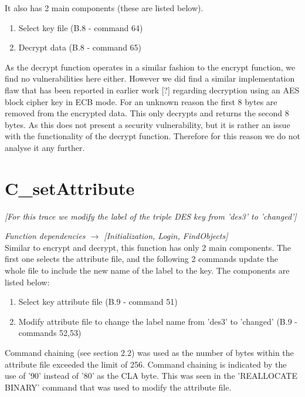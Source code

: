 \documentclass[bsc,frontabs,twoside,singlespacing,parskip,deptreport]{infthesis}     %
\begin{document}
It also has 2 main components (these are listed below).\\

\begin{enumerate}
\item Select key file (B.8 - command 64)
\item Decrypt data (B.8 - command 65)\\
\end{enumerate}

As the decrypt function operates in a similar fashion to the encrypt function, we find no vulnerabilities here either. However we did find a similar implementation flaw that has been reported in earlier work [?] regarding decryption using an AES block cipher key in ECB mode. For an unknown reason the first 8 bytes are removed from the encrypted data. This only decrypts and returns the second 8 bytes. As this does not present a security vulnerability, but it is rather an issue with the functionality of the decrypt function. Therefore for this reason we do not analyse it any further.

\section{C\_setAttribute}
\textit{[For this trace we modify the label of the triple DES key from 'des3' to 'changed']}

\textit{Function dependencies $\rightarrow$ [Initialization, Login, FindObjects]}\\

Similar to encrypt and decrypt, this function has only 2 main components. The first one selects the attribute file, and the following 2 commands update the whole file to include the new name of the label to the key. The components are listed below:\\

\begin{enumerate}
\item Select key attribute file (B.9 - command 51)
\item Modify attribute file to change the label name from 'des3' to  'changed' (B.9 - commands 52,53)\\
\end{enumerate}

Command chaining (see section 2.2) was used as the number of bytes within the attribute file exceeded the limit of 256. Command chaining is indicated by the use of '90' instead of '80' as the CLA byte. This was seen in the 'REALLOCATE BINARY' command that was used to modify the attribute file.
\end{document}

